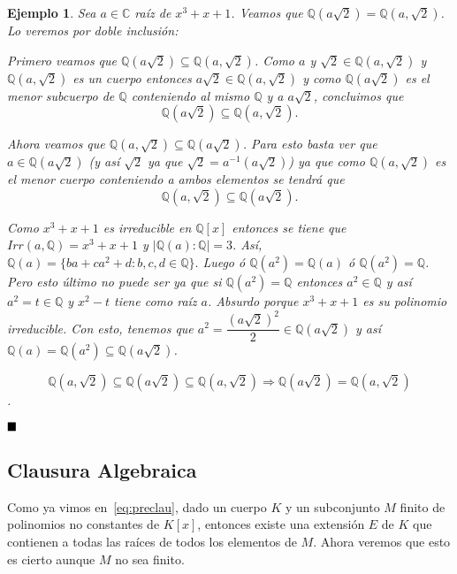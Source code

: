 \documentclass[12pt]{article}
\newtheorem{example}{Ejemplo}[theorem]
\begin{document}
\begin{example} Sea $a\in \mathbb{C}$ raíz de $x^{3}+x+1$. Veamos que $\mathbb{Q}(a\sqrt{2}) = \mathbb{Q}(a,\sqrt{2})$. Lo veremos por doble inclusión:

Primero veamos que $\mathbb{Q}(a\sqrt{2}) \subseteq \mathbb{Q}(a,\sqrt{2})$. Como $a$ y $\sqrt{2} \in \mathbb{Q}(a,\sqrt{2})$ y $\mathbb{Q}(a,\sqrt{2})$ es un cuerpo entonces $a \sqrt{2} \in \mathbb{Q}(a,\sqrt{2})$ y como $\mathbb{Q}(a\sqrt{2})$ es el menor subcuerpo de $\mathbb{Q}$ conteniendo al mismo $\mathbb{Q}$ y a $a\sqrt{2}$, concluimos que $$\mathbb{Q}(a\sqrt{2}) \subseteq \mathbb{Q}(a,\sqrt{2}).$$

Ahora veamos que $\mathbb{Q}(a, \sqrt{2}) \subseteq \mathbb{Q}(a\sqrt{2})$. Para esto basta ver que $a \in \mathbb{Q}(a\sqrt{2})$ (y así $\sqrt{2}$ ya que $\sqrt{2} = a^{-1}(a\sqrt{2})$) ya que como $\mathbb{Q}(a, \sqrt{2})$ es el menor cuerpo conteniendo a ambos elementos se tendrá que $$\mathbb{Q}(a,\sqrt{2}) \subseteq \mathbb{Q}(a\sqrt{2}).$$

Como $x^{3}+x+1$ es irreducible en $\mathbb{Q}[x]$ entonces se tiene que $Irr(a, \mathbb{Q}) = x^{3}+x+1$ y $|\mathbb{Q}(a) : \mathbb{Q}| = 3$. Así, $\mathbb{Q}(a) = \lbrace ba + ca^{2} + d : b,c,d \in \mathbb{Q} \rbrace.$ Luego ó $\mathbb{Q}(a^{2}) = \mathbb{Q}(a)$ ó $\mathbb{Q}(a^{2}) = \mathbb{Q}$. Pero esto último no puede ser ya que si $\mathbb{Q}(a^{2}) = \mathbb{Q}$ entonces $a^{2} \in \mathbb{Q}$ y así $a^{2} = t \in \mathbb{Q}$ y $x^{2}-t$ tiene como raíz $a$. Absurdo porque $x^{3}+x+1$ es su polinomio irreducible. Con esto, tenemos que $a^{2}= \dfrac{(a\sqrt{2})^{2}}{2} \in \mathbb{Q}(a\sqrt{2})$ y así $\mathbb{Q}(a) = \mathbb{Q}(a^{2}) \subseteq \mathbb{Q}(a\sqrt{2})$.

$$\mathbb{Q}(a,\sqrt{2}) \subseteq \mathbb{Q}(a\sqrt{2}) \subseteq \mathbb{Q}(a,\sqrt{2})\Rightarrow \mathbb{Q}(a\sqrt{2}) = \mathbb{Q}(a, \sqrt{2})$$.
\end{example}

$\hfill \blacksquare$

\subsection{Clausura Algebraica}
Como ya vimos en~\ref{eq:preclau}, dado un cuerpo $K$ y un subconjunto $M$ finito de polinomios no constantes de $K[x]$, entonces existe una extensión $E$ de $K$ que contienen a todas las raíces de todos los elementos de $M$. Ahora veremos que esto es cierto aunque $M$ no sea finito.
\end{document}
